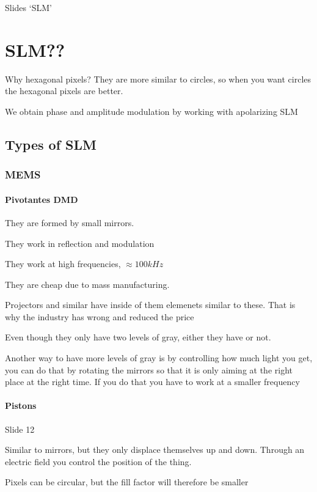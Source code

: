 \documentclass[../main/main.tex]{subfiles}
\begin{document}
Slides `SLM'

\chapter{SLM??}


Why hexagonal pixels? They are more similar to circles, so when you want circles the hexagonal pixels are better.


We obtain phase and amplitude modulation by working with apolarizing SLM

\section{Types of SLM}


\subsection{MEMS}

\subsubsection{Pivotantes DMD}

They are formed by small mirrors.

They work in reflection and modulation

They work at high frequencies, $\approx 100 kHz$

They are cheap due to mass manufacturing.

Projectors and similar have inside of them elemenets similar to these. That is why the industry has wrong and reduced the price

Even though they only have two levels of gray, either they have or not.

Another way to have more levels of gray is by controlling how much light you get, you can do that by rotating the mirrors so that it is only aiming at the right place at the right time.
If you do that you have to work at a smaller frequency


\subsubsection{Pistons}

Slide 12

Similar to mirrors, but they only displace themselves up and down.
Through an electric  field you control the position of the thing.

Pixels can be circular, but the fill factor will therefore be smaller
\end{document}

